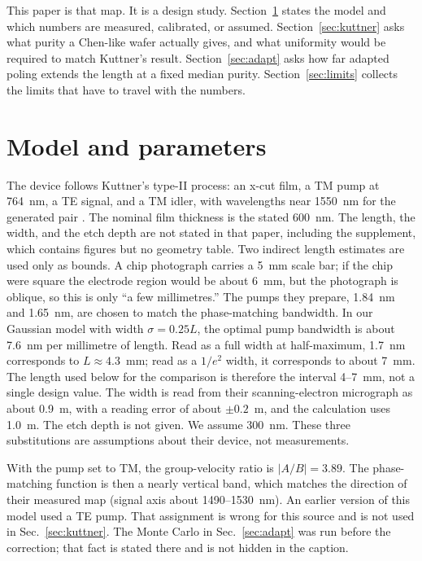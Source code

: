 \documentclass[11pt,a4paper]{article}
\begin{document}
This paper is that map.
It is a design study.
Section~\ref{sec:model} states the model and which numbers are measured, calibrated, or assumed.
Section~\ref{sec:kuttner} asks what purity a Chen-like wafer actually gives, and what uniformity would be required to match Kuttner's result.
Section~\ref{sec:adapt} asks how far adapted poling extends the length at a fixed median purity.
Section~\ref{sec:limits} collects the limits that have to travel with the numbers.

\section{Model and parameters}
\label{sec:model}
The device follows Kuttner's type-II process: an x-cut film, a TM pump at 764~nm, a TE signal, and a TM idler, with wavelengths near 1550~nm for the generated pair \cite{Kuttner2026}.
The nominal film thickness is the stated 600~nm.
The length, the width, and the etch depth are not stated in that paper, including the supplement, which contains figures but no geometry table.
Two indirect length estimates are used only as bounds.
A chip photograph carries a 5~mm scale bar; if the chip were square the electrode region would be about 6~mm, but the photograph is oblique, so this is only ``a few millimetres.''
The pumps they prepare, 1.84~nm and 1.65~nm, are chosen to match the phase-matching bandwidth.
In our Gaussian model with width $\sigma=0.25L$, the optimal pump bandwidth is about 7.6~nm per millimetre of length.
Read as a full width at half-maximum, 1.7~nm corresponds to $L\approx 4.3$~mm; read as a $1/e^{2}$ width, it corresponds to about 7~mm.
The length used below for the comparison is therefore the interval 4--7~mm, not a single design value.
The width is read from their scanning-electron micrograph as about 0.9~\textmu m, with a reading error of about $\pm 0.2$~\textmu m, and the calculation uses 1.0~\textmu m.
The etch depth is not given.
We assume 300~nm.
These three substitutions are assumptions about their device, not measurements.

With the pump set to TM, the group-velocity ratio is $|A/B|=3.89$.
The phase-matching function is then a nearly vertical band, which matches the direction of their measured map (signal axis about 1490--1530~nm).
An earlier version of this model used a TE pump.
That assignment is wrong for this source and is not used in Sec.~\ref{sec:kuttner}.
The Monte Carlo in Sec.~\ref{sec:adapt} was run before the correction; that fact is stated there and is not hidden in the caption.
\end{document}
